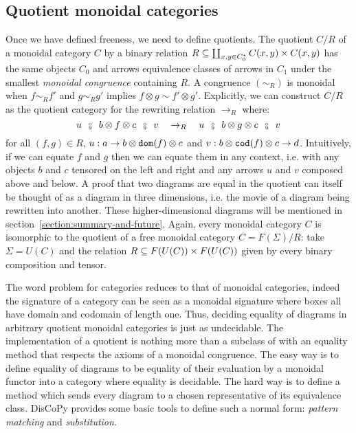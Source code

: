 \subsection{Quotient monoidal categories}\label{subsection:quotient-monoidal}

Once we have defined freeness, we need to define quotients.
The quotient $C / R$ of a monoidal category $C$ by a binary relation $R \subseteq \coprod_{x, y \in C_0^\star} C(x, y) \times C(x, y)$ has the same objects $C_0$ and arrows equivalence classes of arrows in $C_1$ under the smallest \emph{monoidal congruence} containing $R$.
A congruence $(\sim_R)$ is monoidal when $f \sim_R f'$ and $g \sim_R g'$ implies $f \otimes g \sim f' \otimes g'$.
Explicitly, we can construct $C / R$ as the quotient category for the rewriting relation $\to_R$ where:
$$u \s \fcmp \s b \otimes f \otimes c \s \fcmp \s v \quad
\to_R \quad u \s \fcmp \s b \otimes g \otimes c \s \fcmp \s v$$
for all $(f, g) \in R$, $u : a \to b \otimes \mathtt{dom}(f) \otimes c$ and $v : b \otimes \mathtt{cod}(f) \otimes c \to d$.
Intuitively, if we can equate $f$ and $g$ then we can equate them in any context, i.e. with any objects $b$ and $c$ tensored on the left and right and any arrows $u$ and $v$ composed above and below.
A proof that two diagrams are equal in the quotient can itself be thought of as a diagram in three dimensions, i.e. the movie of a diagram being rewritten into another.
These higher-dimensional diagrams will be mentioned in section~\ref{section:summary-and-future}.
Again, every monoidal category $C$ is isomorphic to the quotient of a free monoidal category $C = F(\Sigma) / R$: take $\Sigma = U(C)$ and the relation $R \subseteq F(U(C)) \times F(U(C))$ given by every binary composition and tensor.

The word problem for categories reduces to that of monoidal categories, indeed the signature of a category can be seen as a monoidal signature where boxes all have domain and codomain of length one.
Thus, deciding equality of diagrams in arbitrary quotient monoidal categories is just as undecidable.
The implementation of a quotient is nothing more than a subclass of  with an equality method that respects the axioms of a monoidal congruence.
The easy way is to define equality of diagrams to be equality of their evaluation by a monoidal functor into a category where equality is decidable.
The hard way is to define a  method which sends every diagram to a chosen representative of its equivalence class.
DisCoPy provides some basic tools to define such a normal form: \emph{pattern matching} and \emph{substitution}.

